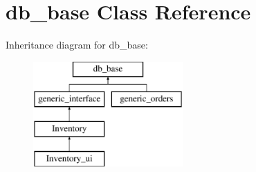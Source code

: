\hypertarget{classdb__base}{}\section{db\+\_\+base Class Reference}
\label{classdb__base}
Inheritance diagram for db\+\_\+base\+:\begin{figure}[H]
\begin{center}
\leavevmode
\includegraphics[height=4.000000cm]{d7/d81/classdb__base}
\end{center}
\end{figure}

